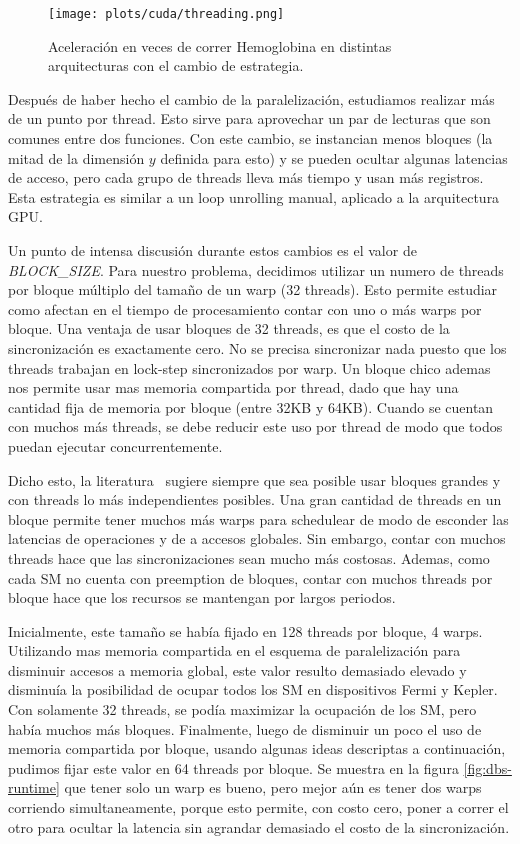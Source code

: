 \begin{figure}[htbp]
   \centering
   \texttt{[image: plots/cuda/threading.png]}
   \caption{Aceleraci\'on en veces de correr Hemoglobina en distintas arquitecturas con el cambio de estrategia.}
   \label{fig:threading}
\end{figure}


Despu\'es de haber hecho el cambio de la paralelizaci\'on, estudiamos realizar
m\'as de un punto por thread. Esto sirve para aprovechar un par de lecturas que son comunes
entre dos funciones. Con este cambio, se instancian menos bloques (la mitad de la dimensi\'on $y$
definida para esto) y se pueden ocultar algunas latencias de acceso, pero
cada grupo de threads lleva m\'as tiempo y usan m\'as registros. Esta estrategia es similar
a un loop unrolling manual, aplicado a la arquitectura GPU.

Un punto de intensa discusi\'on durante estos cambios es el valor de \textit{BLOCK\_SIZE}.
Para nuestro problema, decidimos utilizar un numero de threads por bloque m\'ultiplo del
tama\~no de un warp (32 threads). Esto permite estudiar como afectan en el tiempo de
procesamiento contar con uno o m\'as warps por bloque. Una ventaja de usar bloques de
32 threads, es que el costo de la sincronizaci\'on es exactamente cero. No se precisa
sincronizar nada puesto que los threads trabajan en lock-step sincronizados por warp.
Un bloque chico ademas nos permite usar mas memoria compartida por thread, dado que hay una
cantidad fija de memoria por bloque (entre 32KB y 64KB). Cuando se cuentan con muchos m\'as
threads, se debe reducir este uso por thread de modo que todos puedan ejecutar concurrentemente.

Dicho esto, la literatura~\cite{farberCuda} sugiere siempre que sea posible
usar bloques grandes y con threads lo m\'as independientes posibles. Una gran cantidad de threads
en un bloque permite tener muchos m\'as warps para schedulear de modo de esconder las latencias de
operaciones y de a accesos globales. Sin embargo, contar con muchos threads hace que las
sincronizaciones sean mucho m\'as costosas. Ademas, como cada SM no cuenta con preemption
de bloques, contar con muchos threads por bloque hace que los recursos se mantengan
por largos periodos.

Inicialmente, este tama\~no se hab\'ia fijado en 128 threads por bloque, 4 warps. Utilizando
mas memoria compartida en el esquema de paralelizaci\'on para disminuir accesos a memoria global,
este valor resulto demasiado elevado y disminu\'ia la posibilidad de ocupar todos los SM en dispositivos
Fermi y Kepler. Con solamente 32 threads, se pod\'ia maximizar la ocupaci\'on de los SM, pero hab\'ia
muchos m\'as bloques. Finalmente, luego de disminuir un poco el uso de memoria compartida por
bloque, usando algunas ideas descriptas a continuaci\'on, pudimos fijar este valor en 64 threads
por bloque. Se muestra en la figura \ref{fig:dbs-runtime} que tener solo un warp es bueno, pero
mejor a\'un es tener dos warps corriendo simultaneamente, porque
esto permite, con costo cero, poner a correr el otro para ocultar la latencia sin agrandar
demasiado el costo de la sincronizaci\'on.

